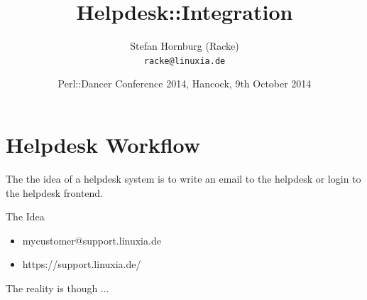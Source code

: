 \usepackage[utf8]{inputenc}
\usepackage[T1]{fontenc}
\usepackage{mathptmx}
\usepackage[scaled=.90]{helvet}
\usepackage{courier}
\usepackage{caption}
\captionsetup{labelformat=empty,labelsep=none}
\usepackage{verbatim}
\usepackage{hyperref}
\usepackage{listings}
\usepackage{ulem}
\lstset{language=Perl,basicstyle=\normalsize,tabsize=3,showstringspaces=false}

\title{Helpdesk::Integration}
\author[racke]{Stefan Hornburg (Racke)\\ \texttt{racke@linuxia.de}}
\date{Perl::Dancer Conference 2014, Hancock, 9th October 2014}


\maketitle{}

\begin{frame}
  \titlepage
\end{frame}

\tableofcontents

\section{Helpdesk Workflow}

The the idea of a helpdesk system is to write an email to the helpdesk
or login to the helpdesk frontend.

\begin{frame}[fragile]{The Idea}
\begin{itemize}
\item mycustomer@support.linuxia.de
\item https://support.linuxia.de/
\end{itemize}
\end{frame}

The reality is though ...


